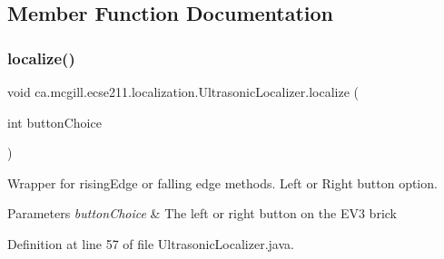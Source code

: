 \subsection{Member Function Documentation}
\mbox{\label{classca_1_1mcgill_1_1ecse211_1_1localization_1_1_ultrasonic_localizer_ab78196997d7409aec0c35603686989ad}} 
\subsubsection{\texorpdfstring{localize()}{localize()}}
{\footnotesize\ttfamily void ca.\+mcgill.\+ecse211.\+localization.\+Ultrasonic\+Localizer.\+localize (\begin{DoxyParamCaption}\item[{int}]{button\+Choice }\end{DoxyParamCaption})}

Wrapper for rising\+Edge or falling edge methods. Left or Right button option.


\begin{DoxyParams}{Parameters}
{\em button\+Choice} & The left or right button on the E\+V3 brick \\
\hline
\end{DoxyParams}


Definition at line 57 of file Ultrasonic\+Localizer.\+java.


